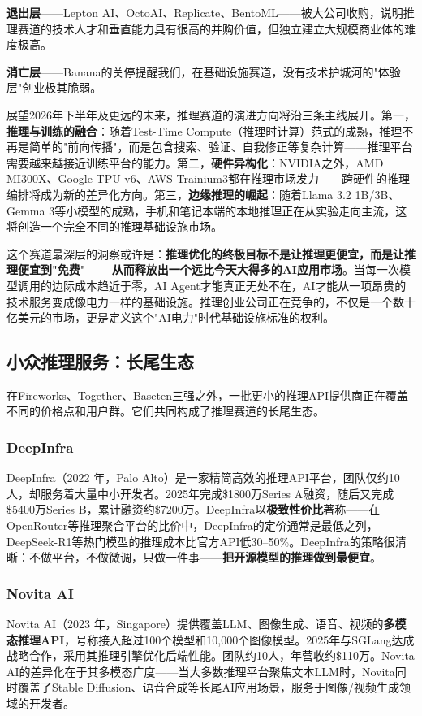 \textbf{退出层}——Lepton AI、OctoAI、Replicate、BentoML——被大公司收购，说明推理赛道的技术人才和垂直能力具有很高的并购价值，但独立建立大规模商业体的难度极高。

\textbf{消亡层}——Banana的关停提醒我们，在基础设施赛道，没有技术护城河的"体验层"创业极其脆弱。

展望2026年下半年及更远的未来，推理赛道的演进方向将沿三条主线展开。第一，\textbf{推理与训练的融合}：随着Test-Time Compute（推理时计算）范式的成熟，推理不再是简单的"前向传播"，而是包含搜索、验证、自我修正等复杂计算——推理平台需要越来越接近训练平台的能力。第二，\textbf{硬件异构化}：NVIDIA之外，AMD MI300X、Google TPU v6、AWS Trainium3都在推理市场发力——跨硬件的推理编排将成为新的差异化方向。第三，\textbf{边缘推理的崛起}：随着Llama 3.2 1B/3B、Gemma 3等小模型的成熟，手机和笔记本端的本地推理正在从实验走向主流，这将创造一个完全不同的推理基础设施市场。

这个赛道最深层的洞察或许是：\textbf{推理优化的终极目标不是让推理更便宜，而是让推理便宜到"免费"——从而释放出一个远比今天大得多的AI应用市场}。当每一次模型调用的边际成本趋近于零，AI Agent才能真正无处不在，AI才能从一项昂贵的技术服务变成像电力一样的基础设施。推理创业公司正在竞争的，不仅是一个数十亿美元的市场，更是定义这个"AI电力"时代基础设施标准的权利。

\subsection{小众推理服务：长尾生态}
\label{subsec:inference-longtail}

在Fireworks、Together、Baseten三强之外，一批更小的推理API提供商正在覆盖不同的价格点和用户群。它们共同构成了推理赛道的长尾生态。

\subsubsection{DeepInfra}
DeepInfra（2022 年，Palo Alto）是一家精简高效的推理API平台，团队仅约10人，却服务着大量中小开发者。2025年完成\$1800万Series A融资，随后又完成\$5400万Series B，累计融资约\$7200万。DeepInfra以\textbf{极致性价比}著称——在OpenRouter等推理聚合平台的比价中，DeepInfra的定价通常是最低之列，DeepSeek-R1等热门模型的推理成本比官方API低30--50\%。DeepInfra的策略很清晰：不做平台，不做微调，只做一件事——\textbf{把开源模型的推理做到最便宜}。

\subsubsection{Novita AI}
Novita AI（2023 年，Singapore）提供覆盖LLM、图像生成、语音、视频的\textbf{多模态推理API}，号称接入超过100个模型和10,000个图像模型。2025年与SGLang达成战略合作，采用其推理引擎优化后端性能。团队约10人，年营收约\$110万。Novita AI的差异化在于其多模态广度——当大多数推理平台聚焦文本LLM时，Novita同时覆盖了Stable Diffusion、语音合成等长尾AI应用场景，服务于图像/视频生成领域的开发者。

